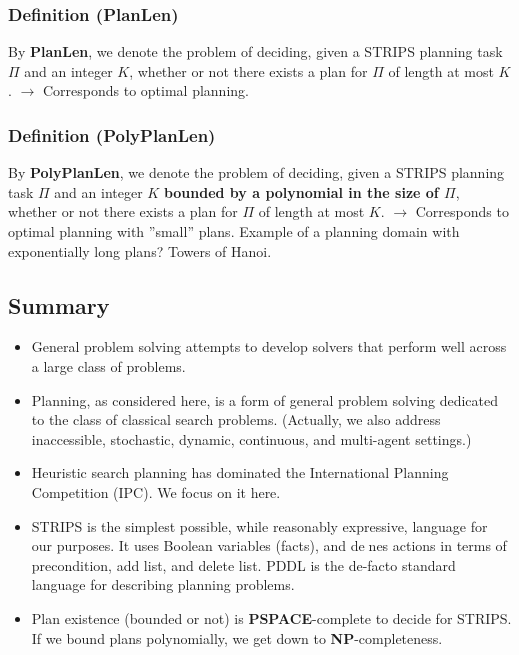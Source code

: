 \documentclass[conference, a4paper]{styles/acmsiggraph}
\begin{document}
        \subsubsection{Definition (PlanLen)}
            By \textbf{PlanLen}, we denote the problem of deciding, given a STRIPS planning task $\Pi$ and an integer $K$, whether or not there exists a plan for $\Pi$ of length at most $K$.\newline
            $\rightarrow$ Corresponds to optimal planning.

\newpage

        \subsubsection{Definition (PolyPlanLen)}
            By \textbf{PolyPlanLen}, we denote the problem of deciding, given a STRIPS planning task $\Pi$ and an integer $K$ \textbf{bounded by a polynomial in the size of $\Pi$}, whether or not there exists a plan for $\Pi$ of length at most $K$.\newline
            $\rightarrow$ Corresponds to optimal planning with ''small'' plans.\newline
            Example of a planning domain with exponentially long plans? Towers of Hanoi.
        
    \subsection{Summary}
        \begin{itemize}
            \item General problem solving attempts to develop solvers that perform well across a large class of problems.
            \item Planning, as considered here, is a form of general problem solving dedicated to the class of classical search problems. 
            (Actually, we also address inaccessible, stochastic, dynamic, continuous, and multi-agent settings.)
            \item Heuristic search planning has dominated the International Planning Competition (IPC). 
            We focus on it here.
            \item STRIPS is the simplest possible, while reasonably expressive, language for our purposes. 
            It uses Boolean variables (facts), and denes actions in terms of precondition, add list, and delete list.
            PDDL is the de-facto standard language for describing planning problems.
            \item Plan existence (bounded or not) is \textbf{PSPACE}-complete to decide for STRIPS. 
            If we bound plans polynomially, we get down to \textbf{NP}-completeness.
        \end{itemize}
\end{document}
